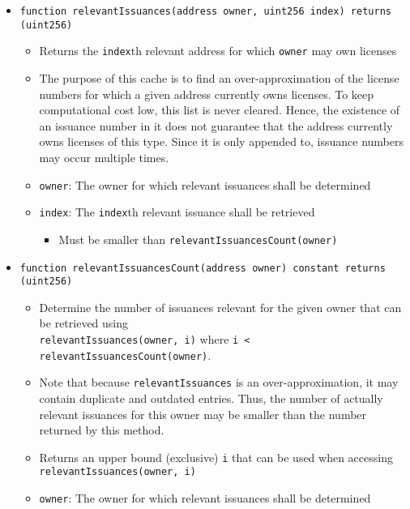 \documentclass[a4paper]{article}
\begin{document}
\begin{itemize}
  \item \texttt{function relevantIssuances(address owner, uint256 index) returns (uint256)}
  \begin{itemize}
    \item Returns the \texttt{index}th relevant address for which \texttt{owner} may own licenses
    \item The purpose of this cache is to find an over-approximation of the license numbers for which a given address currently owns licenses. To keep computational cost low, this list is never cleared. Hence, the existence of an issuance number in it does not guarantee that the address currently owns licenses of this type. Since it is only appended to, issuance numbers may occur multiple times.
    \item \texttt{owner}: The owner for which relevant issuances shall be determined
    \item \texttt{index}: The \texttt{index}th relevant issuance shall be retrieved
    \begin{itemize}
      \item Must be smaller than \texttt{relevantIssuancesCount(owner)}
    \end{itemize}
  \end{itemize}
  
  \item \texttt{function relevantIssuancesCount(address owner) constant returns (uint256)}
  \begin{itemize}
    \item Determine the number of issuances relevant for the given owner that can be retrieved using \\\texttt{relevantIssuances(owner, i)} where \texttt{i < relevantIssuancesCount(owner)}.
    \item Note that because \texttt{relevantIssuances} is an over-approximation, it may contain duplicate and outdated entries. Thus, the number of actually relevant issuances for this owner may be smaller than the number returned by this method.
    \item Returns an upper bound (exclusive) \texttt{i} that can be used when accessing \texttt{relevantIssuances(owner, i)}
    \item \texttt{owner}: The owner for which relevant issuances shall be determined
  \end{itemize}
  

\end{itemize}
\end{document}
